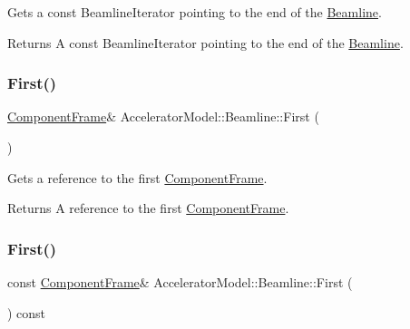Gets a const Beamline\+Iterator pointing to the end of the \hyperlink{classAcceleratorModel_1_1Beamline}{Beamline}. \begin{DoxyReturn}{Returns}
A const Beamline\+Iterator pointing to the end of the \hyperlink{classAcceleratorModel_1_1Beamline}{Beamline}. 
\end{DoxyReturn}
\mbox{\label{classAcceleratorModel_1_1Beamline_a56c50274a705cd04a6059ffe384c897a}} 
\subsubsection{\texorpdfstring{First()}{First()}\hspace{0.1cm}{\footnotesize\ttfamily [1/2]}}
{\footnotesize\ttfamily \hyperlink{classComponentFrame}{Component\+Frame}\& Accelerator\+Model\+::\+Beamline\+::\+First (\begin{DoxyParamCaption}{ }\end{DoxyParamCaption})\hspace{0.3cm}{\ttfamily [inline]}}

Gets a reference to the first \hyperlink{classComponentFrame}{Component\+Frame}. \begin{DoxyReturn}{Returns}
A reference to the first \hyperlink{classComponentFrame}{Component\+Frame}. 
\end{DoxyReturn}
\mbox{\label{classAcceleratorModel_1_1Beamline_aa1a924ddf820afe8c914a4ff03893bc3}} 
\subsubsection{\texorpdfstring{First()}{First()}\hspace{0.1cm}{\footnotesize\ttfamily [2/2]}}
{\footnotesize\ttfamily const \hyperlink{classComponentFrame}{Component\+Frame}\& Accelerator\+Model\+::\+Beamline\+::\+First (\begin{DoxyParamCaption}{ }\end{DoxyParamCaption}) const\hspace{0.3cm}{\ttfamily [inline]}}

